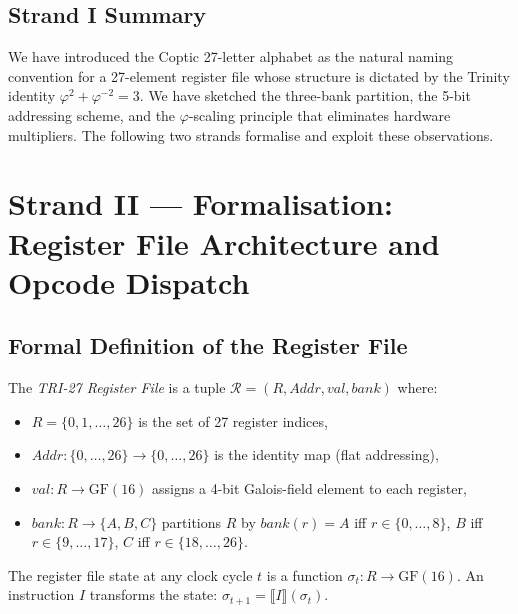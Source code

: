 \subsection{Strand I Summary}
\label{subsec:71:intuition-summary}

We have introduced the Coptic 27-letter alphabet as the natural
naming convention for a 27-element register file whose structure
is dictated by the Trinity identity $\varphi^2 + \varphi^{-2} = 3$.
We have sketched the three-bank partition, the 5-bit addressing
scheme, and the $\varphi$-scaling principle that eliminates hardware
multipliers.  The following two strands formalise and exploit these
observations.

\section{Strand II — Formalisation: Register File Architecture and Opcode Dispatch}
\label{sec:71:formalisation}

\subsection{Formal Definition of the Register File}
\label{subsec:71:regfile-def}

\begin{definition}
\label{def:71:regfile}
The \emph{TRI-27 Register File} is a tuple
$\mathcal{R} = (R, \mathit{Addr}, \mathit{val}, \mathit{bank})$
where:
\begin{itemize}
  \item $R = \{0, 1, \ldots, 26\}$ is the set of 27 register indices,
  \item $\mathit{Addr} : \{0,\ldots,26\} \to \{0,\ldots,26\}$ is the
    identity map (flat addressing),
  \item $\mathit{val} : R \to \mathrm{GF}(16)$ assigns a 4-bit Galois-field
    element to each register,
  \item $\mathit{bank} : R \to \{A, B, C\}$ partitions $R$ by
    $\mathit{bank}(r) = A$ iff $r \in \{0,\ldots,8\}$,
    $B$ iff $r \in \{9,\ldots,17\}$,
    $C$ iff $r \in \{18,\ldots,26\}$.
\end{itemize}
\end{definition}

The register file state at any clock cycle $t$ is a function
$\sigma_t : R \to \mathrm{GF}(16)$.  An instruction $I$ transforms the
state: $\sigma_{t+1} = \llbracket I \rrbracket(\sigma_t)$.

